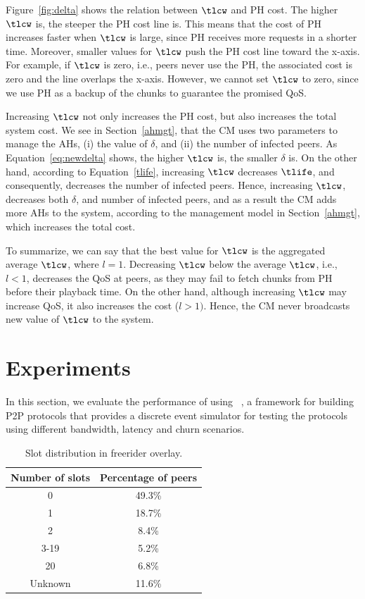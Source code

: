 Figure~\ref{fig:delta} shows the relation between $\tlcw$ and PH cost.
The higher $\tlcw$ is, the steeper the PH cost line is. This 
means that the cost of PH increases faster when 
$\tlcw$ is large, since PH receives more requests in a shorter time. Moreover,
smaller values for $\tlcw$ push the PH cost line toward the x-axis. For
example, if $\tlcw$ is zero, i.e., peers never use the PH, the associated  cost is zero and
the line overlaps the x-axis. However, we cannot set $\tlcw$ to zero, since we
use PH as a backup of the chunks to guarantee the promised QoS.

Increasing $\tlcw$ not only increases the PH cost, but also increases the
total system cost. We see in Section~\ref{ahmgt}, that the CM uses two parameters to
manage the AHs, (i) the value of $\delta$, and (ii) the number of infected
peers. As Equation~\ref{eq:newdelta} shows, the higher $\tlcw$ is, the smaller
$\delta$ is. On the other hand, according to Equation~\ref{tlife}, increasing
$\tlcw$ decreases $\tlife$, and consequently, decreases the number of infected
peers. Hence, increasing $\tlcw$, decreases both $\delta$, and number of
infected peers, and as a result the CM adds more AHs to the system, according to
the management model in Section~\ref{ahmgt}, which increases the total cost.

To summarize, we can say that the best value for $\tlcw$ is the aggregated
average $\tlcw$, where $l = 1$. Decreasing $\tlcw$ below the average $\tlcw$,
i.e., $l < 1$, decreases the QoS at peers, as they may fail to fetch chunks
from PH before their playback time. On the other hand, although increasing
$\tlcw$ may increase QoS, it also increases the cost ($l > 1)$. Hence, the CM
never broadcasts new value of $\tlcw$ to the system.

\section{Experiments} \label{sec:evaluation}

In this section, we evaluate the performance of \clive using
\kompics~\cite{kompics}, a framework for building P2P protocols that provides
a discrete event simulator for testing the protocols using different
bandwidth, latency and churn scenarios.

\begin{table}[!ht]
\caption{\small Slot distribution in freerider overlay.}
\begin{center}
\begin{tabular}{| c | c |}
 \hline
  Number of slots & Percentage of peers \\ \hline \hline
  0 & 49.3\% \\ \hline
  1 & 18.7\% \\ \hline
  2 & 8.4\% \\ \hline
  3-19 & 5.2\% \\ \hline
  20 & 6.8\% \\ \hline
  Unknown & 11.6\% \\ \hline
  \end{tabular}
\label{tb:slotdist}
\end{center}
\end{table}

